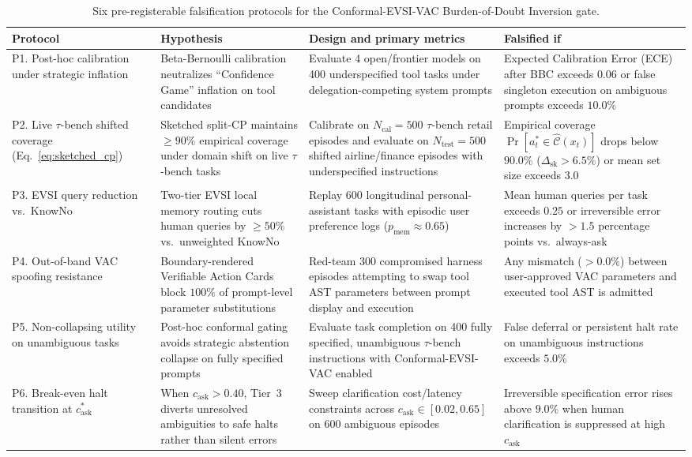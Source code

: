 \documentclass[11pt]{article}
\begin{document}
\begin{table}[ht]
\centering
\small
\caption{Six pre-registerable falsification protocols for the Conformal-EVSI-VAC Burden-of-Doubt Inversion gate.}
\label{tab:protocol}
\begin{tabularx}{\textwidth}{@{}P{2.3cm}YYY@{}}
\toprule
Protocol & Hypothesis & Design and primary metrics & Falsified if \\
\midrule
P1. Post-hoc calibration under strategic inflation & Beta-Bernoulli calibration neutralizes ``Confidence Game'' inflation on tool candidates \citep{arghal2026confidence} & Evaluate 4 open/frontier models on 400 underspecified tool tasks under delegation-competing system prompts & Expected Calibration Error (ECE) after BBC exceeds $0.06$ or false singleton execution on ambiguous prompts exceeds $10.0\%$\\
P2. Live $\tau$-bench shifted coverage (Eq.~\ref{eq:sketched_cp}) & Sketched split-CP maintains $\ge 90\%$ empirical coverage under domain shift on live $\tau$-bench tasks \citep{yao2024taubench, ren2023knowno} & Calibrate on $N_{\mathrm{cal}}=500$ $\tau$-bench retail episodes and evaluate on $N_{\mathrm{test}}=500$ shifted airline/finance episodes with underspecified instructions & Empirical coverage $\Pr[a_t^* \allowbreak \in \hat{\mathcal{C}}(x_t)]$ drops below $90.0\%$ ($\Delta_{\mathrm{sk}} > 6.5\%$) or mean set size exceeds $3.0$\\
P3. EVSI query reduction vs.\ KnowNo & Two-tier EVSI local memory routing cuts human queries by $\ge 50\%$ vs.\ unweighted KnowNo \citep{ren2023knowno, zhang2024clarify} & Replay 600 longitudinal personal-assistant tasks with episodic user preference logs ($p_{\mathrm{mem}} \approx 0.65$) & Mean human queries per task exceeds $0.25$ or irreversible error increases by $>1.5$ percentage points vs.\ always-ask\\
P4. Out-of-band VAC spoofing resistance & Boundary-rendered Verifiable Action Cards block $100\%$ of prompt-level parameter substitutions \citep{breckenridge2026ihitl, zhao2026clawguard} & Red-team 300 compromised harness episodes attempting to swap tool AST parameters between prompt display and execution & Any mismatch ($>0.0\%$) between user-approved VAC parameters and executed tool AST is admitted\\
P5. Non-collapsing utility on unambiguous tasks & Post-hoc conformal gating avoids strategic abstention collapse on fully specified prompts \citep{sahoo2026bettercall} & Evaluate task completion on 400 fully specified, unambiguous $\tau$-bench instructions with Conformal-EVSI-VAC enabled & False deferral or persistent halt rate on unambiguous instructions exceeds $5.0\%$\\
P6. Break-even halt transition at $c_{\mathrm{ask}}^*$ & When $c_{\mathrm{ask}} > 0.40$, Tier~3 diverts unresolved ambiguities to safe halts rather than silent errors & Sweep clarification cost/latency constraints across $c_{\mathrm{ask}} \allowbreak \in [0.02,\allowbreak 0.65]$ on 600 ambiguous episodes & Irreversible specification error rises above $9.0\%$ when human clarification is suppressed at high $c_{\mathrm{ask}}$\\
\bottomrule\end{tabularx}
\end{table}
\end{document}
